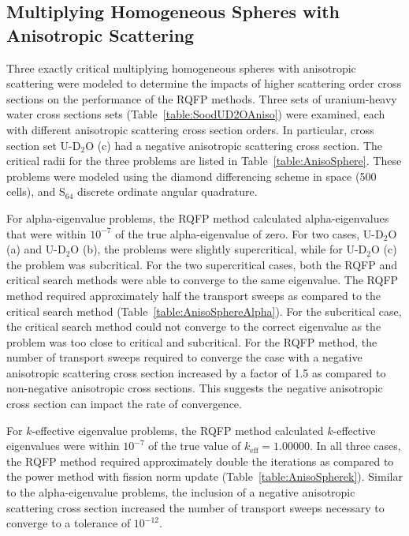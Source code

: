 \clearpage

\subsection{Multiplying Homogeneous Spheres with Anisotropic Scattering}

Three exactly critical multiplying homogeneous spheres with anisotropic scattering were modeled to determine the impacts of higher scattering order cross sections on the performance of the RQFP methods. Three sets of uranium-heavy water cross sections sets (Table~\ref{table:SoodUD2OAniso}) were examined, each with different anisotropic scattering cross section orders. In particular, cross section set U-D$_{2}$O (c) had a negative anisotropic scattering cross section. The critical radii for the three problems are listed in Table~\ref{table:AnisoSphere}. These problems were modeled using the diamond differencing scheme in space (500 cells), and S$_{64}$ discrete ordinate angular quadrature.

For alpha-eigenvalue problems, the RQFP method calculated alpha-eigenvalues that were within $10^{-7}$ of the true alpha-eigenvalue of zero. For two cases, U-D$_{2}$O (a) and U-D$_{2}$O (b), the problems were slightly supercritical, while for U-D$_{2}$O (c) the problem was subcritical. For the two supercritical cases, both the RQFP and critical search methods were able to converge to the same eigenvalue. The RQFP method required approximately half the transport sweeps as compared to the critical search method (Table~\ref{table:AnisoSphereAlpha}). For the subcritical case, the critical search method could not converge to the correct eigenvalue as the problem was too close to critical and subcritical. For the RQFP method, the number of transport sweeps required to converge the case with a negative anisotropic scattering cross section increased by a factor of 1.5 as compared to non-negative anisotropic cross sections. This suggests the negative anisotropic cross section can impact the rate of convergence.

For $k$-effective eigenvalue problems, the RQFP method calculated $k$-effective eigenvalues were within $10^{-7}$ of the true value of $k_{\text{eff}}=1.00000$. In all three cases, the RQFP method required approximately double the iterations as compared to the power method with fission norm update (Table~\ref{table:AnisoSpherek}). Similar to the alpha-eigenvalue problems, the inclusion of a negative anisotropic scattering cross section increased the number of transport sweeps necessary to converge to a tolerance of $10^{-12}$.

